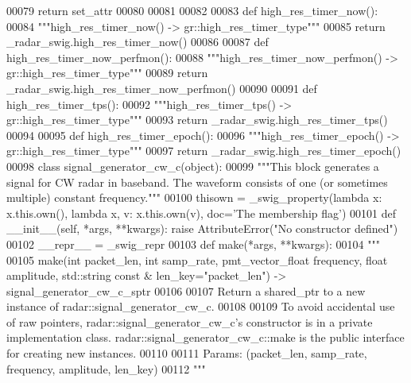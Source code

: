 \begin{DoxyCode}
{{{00079     \textcolor{keywordflow}{return} set\_attr
00080 
00081 
00082 
00083 \textcolor{keyword}{def }high_res_timer_now():
00084   \textcolor{stringliteral}{"""high\_res\_timer\_now() -> gr::high\_res\_timer\_type"""}
00085   \textcolor{keywordflow}{return} \_radar\_swig.high\_res\_timer\_now()
00086 
00087 \textcolor{keyword}{def }high_res_timer_now_perfmon():
00088   \textcolor{stringliteral}{"""high\_res\_timer\_now\_perfmon() -> gr::high\_res\_timer\_type"""}
00089   \textcolor{keywordflow}{return} \_radar\_swig.high\_res\_timer\_now\_perfmon()
00090 
00091 \textcolor{keyword}{def }high_res_timer_tps():
00092   \textcolor{stringliteral}{"""high\_res\_timer\_tps() -> gr::high\_res\_timer\_type"""}
00093   \textcolor{keywordflow}{return} \_radar\_swig.high\_res\_timer\_tps()
00094 
00095 \textcolor{keyword}{def }high_res_timer_epoch():
00096   \textcolor{stringliteral}{"""high\_res\_timer\_epoch() -> gr::high\_res\_timer\_type"""}
00097   \textcolor{keywordflow}{return} \_radar\_swig.high\_res\_timer\_epoch()
00098 \textcolor{keyword}{class }signal_generator_cw_c(object):
00099     \textcolor{stringliteral}{"""This block generates a signal for CW radar in baseband. The waveform consists of one (or sometimes
       multiple) constant frequency."""}
00100     thisown = _swig_property(\textcolor{keyword}{lambda} x: x.this.own(), \textcolor{keyword}{lambda} x, v: x.this.own(v), doc=\textcolor{stringliteral}{'The membership flag'})
00101     \textcolor{keyword}{def }__init__(self, *args, **kwargs): \textcolor{keywordflow}{raise} AttributeError(\textcolor{stringliteral}{"No constructor defined"})
00102     \_\_repr\_\_ = \_swig\_repr
00103     \textcolor{keyword}{def }make(*args, **kwargs):
00104         \textcolor{stringliteral}{"""}
00105 \textcolor{stringliteral}{        make(int packet\_len, int samp\_rate, pmt\_vector\_float frequency, float amplitude, std::string const
       & len\_key="packet\_len") -> signal\_generator\_cw\_c\_sptr}
00106 \textcolor{stringliteral}{}
00107 \textcolor{stringliteral}{        Return a shared\_ptr to a new instance of radar::signal\_generator\_cw\_c.}
00108 \textcolor{stringliteral}{}
00109 \textcolor{stringliteral}{        To avoid accidental use of raw pointers, radar::signal\_generator\_cw\_c's constructor is in a private
       implementation class. radar::signal\_generator\_cw\_c::make is the public interface for creating new
       instances.}
00110 \textcolor{stringliteral}{}
00111 \textcolor{stringliteral}{        Params: (packet\_len, samp\_rate, frequency, amplitude, len\_key)}
00112 \textcolor{stringliteral}{        """}
}}}
\end{DoxyCode}
